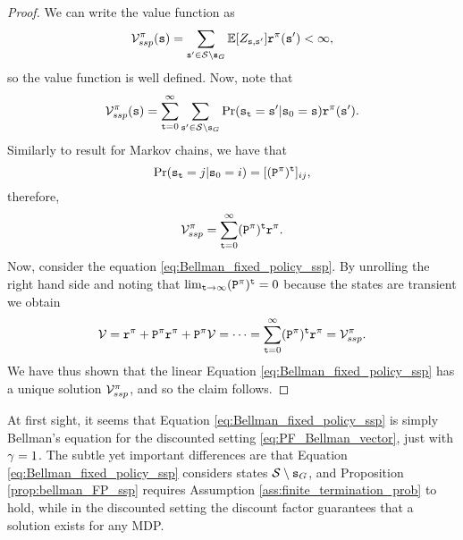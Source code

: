 \begin{proof}
We can write the value function as
\begin{equation*}
    \mathcal{V}_{ssp}^\pi ({\tt s}) = \sum_{{\tt s}' \in  \mathcal{S} \setminus {\tt s}_G} \mathbb{E}[Z_{{\tt s},{\tt s}'}] {\tt r}^{\pi}({\tt s}') < \infty,
\end{equation*}
so the value function is well defined. Now, note that
\begin{equation*}
    \mathcal{V}_{ssp}^\pi ({\tt s}) = \sum_{{\tt t}=0}^\infty \sum_{{\tt s}' \in  \mathcal{S} \setminus {\tt s}_G} \Pr ({\tt s}_{\tt t} = {\tt s}' | {\tt s}_0 = {\tt s}) {\tt r}^{\pi}({\tt s}').
\end{equation*}
Similarly to result for Markov chains, we have that
\begin{equation*}
    \Pr ({\tt s}_{\tt t} = j | {\tt s}_0 = i) =  {[({\tt P}^\pi)^{\tt t}]_{ij}},
\end{equation*}
therefore,
\begin{equation*}
    \mathcal{V}_{ssp}^\pi = \sum_{{\tt t}=0}^\infty ({\tt P}^\pi)^{\tt t} {\tt r}^{\pi}.
\end{equation*}
Now, consider the equation \eqref{eq:Bellman_fixed_policy_ssp}.
By unrolling the right hand side and noting that $\lim_{{\tt t} \to \infty}({\tt P}^\pi)^{\tt t} =0$ because the states are transient we obtain
\begin{equation*}
    \mathcal{V} = {\tt r}^{\pi} + {\tt P}^\pi {\tt r}^{\pi} + {\tt P}^\pi \mathcal{V} = \dots = \sum_{{\tt t}=0}^\infty ({\tt P}^\pi)^{\tt t} {\tt r}^{\pi} = \mathcal{V}_{ssp}^\pi.
\end{equation*}
We have thus shown that the linear Equation \ref{eq:Bellman_fixed_policy_ssp} has a unique solution $\mathcal{V}_{ssp}^\pi$, and so the claim follows.
\end{proof}

\begin{remark}
    At first sight, it seems that Equation \ref{eq:Bellman_fixed_policy_ssp} is simply Bellman's equation for the discounted setting \eqref{eq:PF_Bellman_vector}, just with $\gamma=1$. The subtle yet important differences are that Equation \ref{eq:Bellman_fixed_policy_ssp} considers states $\mathcal{S} \setminus {\tt s}_G$, and Proposition \ref{prop:bellman_FP_ssp} requires Assumption \ref{ass:finite_termination_prob} to hold, while in the discounted setting the discount factor guarantees that a solution exists for any MDP.
\end{remark}

